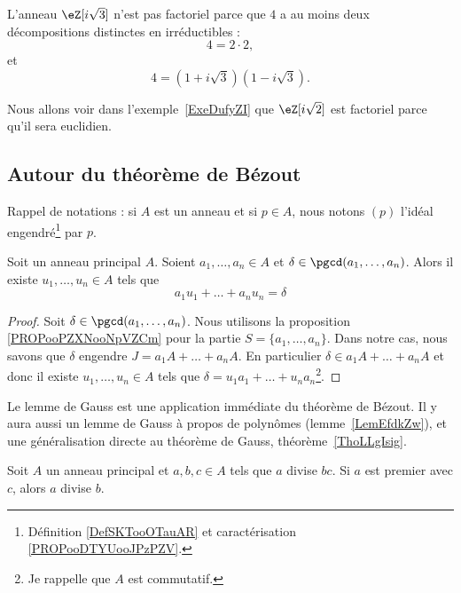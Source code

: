 \begin{example} \label{EXooCWJUooCDJqkr}
	L'anneau \( \eZ[i\sqrt{3}]\) n'est pas factoriel parce que \( 4\) a au moins deux décompositions distinctes en irréductibles :
	\begin{equation}
		4=2\cdot 2,
	\end{equation}
	et
	\begin{equation}
		4=(1+i\sqrt{3})(1-i\sqrt{3}).
	\end{equation}
\end{example}

Nous allons voir dans l'exemple~\ref{ExeDufyZI} que \( \eZ[i\sqrt{2}]\) est factoriel parce qu'il sera euclidien.

\subsection{Autour du théorème de Bézout}

Rappel de notations : si \( A\) est un anneau et si \( p\in A\), nous notons \( (p)\) l'idéal engendré\footnote{Définition \ref{DefSKTooOTauAR} et caractérisation \ref{PROPooDTYUooJPzPZV}.} par \( p\).


\begin{proposition}	\label{PROPooXQKMooWJlEFq}
	Soit un anneau principal \( A\). Soient \( a_1,\ldots,a_n\in A\) et \( \delta\in \pgcd(a_1,\ldots,a_n)\). Alors il existe \( u_1,\ldots,u_n\in A\) tels que
	\begin{equation}
		a_1u_1+\ldots+a_nu_n=\delta
	\end{equation}
\end{proposition}

\begin{proof}
	Soit \( \delta\in\pgcd(a_1,\ldots,a_n)\). Nous utilisons la proposition \ref{PROPooPZXNooNpVZCm} pour la partie \( S=\{ a_1,\ldots,a_n\}\). Dans notre cas, nous savons que \( \delta\) engendre \( J=a_1A+\ldots+a_nA\). En particulier \( \delta\in a_1A+\ldots+a_nA\) et donc il existe \( u_1,\ldots,u_n\in A\) tels que \( \delta=u_1a_1+\ldots+u_na_n\)\footnote{Je rappelle que \( A\) est commutatif.}.
\end{proof}

Le lemme de Gauss est une application immédiate du théorème de Bézout. Il y aura aussi un lemme de Gauss à propos de polynômes (lemme~\ref{LemEfdkZw}), et une généralisation directe au théorème de Gauss, théorème~\ref{ThoLLgIsig}.
\begin{lemma}    \label{LemSdnZNX}
	Soit \( A\) un anneau principal et \( a,b,c\in A\) tels que \( a\) divise \( bc\). Si \( a\) est premier avec \( c\), alors \( a\) divise \( b\).
\end{lemma}

